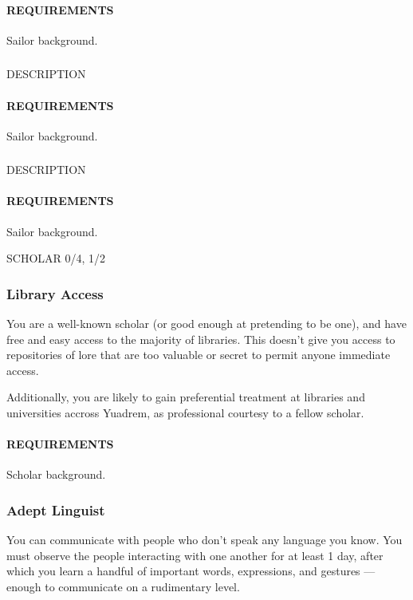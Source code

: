     \paragraph{REQUIREMENTS} Sailor background.

    \subsubsection{} \label{feat::NAME}
    DESCRIPTION
    \paragraph{REQUIREMENTS} Sailor background.

    \subsubsection{} \label{feat::NAME}
    DESCRIPTION
    \paragraph{REQUIREMENTS} Sailor background.

SCHOLAR 0/4, 1/2
    \subsubsection{Library Access} \label{feat::libraryaccess}
    You are a well-known scholar (or good enough at pretending to be one), and have free and easy access to the majority of libraries.
    This doesn't give you access to repositories of lore that are too valuable or secret to permit anyone immediate access.

    Additionally, you are likely to gain preferential treatment at libraries and universities accross Yuadrem, as professional courtesy to a fellow scholar.
    \paragraph{REQUIREMENTS} Scholar background.

    \subsubsection{Adept Linguist} \label{feat::adeptlinguist}
    You can communicate with people who don't speak any language you know.
    You must observe the people interacting with one another for at least 1 day, after which you learn a handful of important words, expressions, and gestures --- enough to communicate on a rudimentary level.
